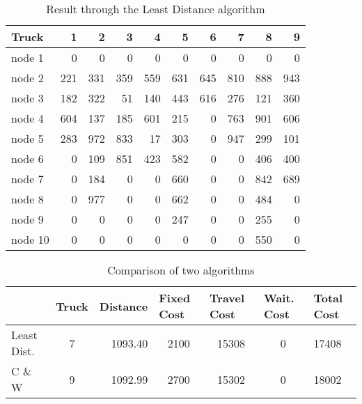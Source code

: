 \documentclass[12pt]{article}
\numberwithin{equation}{section}
\begin{document}
\begin{table}[htbp]
  \centering
  \caption{Result through the Least Distance algorithm}
    \begin{tabular}{lrrrrrrrrr}
    \hline
    Truck & 1     & 2     & 3     & 4     & 5     & 6     & 7     & 8     & 9 \\
    \hline
    node 1 & 0     & 0     & 0     & 0     & 0     & 0     & 0     & 0     & 0 \\
    node 2 & 221   & 331   & 359   & 559   & 631   & 645   & 810   & 888   & 943 \\
    node 3 & 182   & 322   & 51    & 140   & 443   & 616   & 276   & 121   & 360 \\
    node 4 & 604   & 137   & 185   & 601   & 215   & 0     & 763   & 901   & 606 \\
    node 5 & 283   & 972   & 833   & 17    & 303   & 0     & 947   & 299   & 101 \\
    node 6 & 0     & 109   & 851   & 423   & 582   & 0     & 0     & 406   & 400 \\
    node 7 & 0     & 184   & 0     & 0     & 660   & 0     & 0     & 842   & 689 \\
    node 8 & 0     & 977   & 0     & 0     & 662   & 0     & 0     & 484   & 0 \\
    node 9 & 0     & 0     & 0     & 0     & 247   & 0     & 0     & 255   & 0 \\
    node 10 & 0     & 0     & 0     & 0     & 0     & 0     & 0     & 550   & 0 \\
    \hline
    \end{tabular}%
  \label{tab:LeastDistance}%
\end{table}%


\begin{table}[htbp]
  \centering
  \caption{Comparison of two algorithms}
    \begin{tabular}{lcrcccl}
    \hline
          & \multicolumn{1}{l}{Truck} & \multicolumn{1}{l}{Distance} & \multicolumn{1}{l}{Fixed Cost} & \multicolumn{1}{l}{Travel Cost} & \multicolumn{1}{l}{Wait. Cost} & \multicolumn{1}{l}{Total Cost} \\
    \hline
    Least Dist.  & 7     & 1093.40 & 2100  & 15308 & 0     & 17408 \\
    C \& W & 9     & 1092.99 & 2700  & 15302 & 0     & 18002 \\
    \hline
    \end{tabular}%
  \label{tab:comparison}%
\end{table}%
\end{document}
